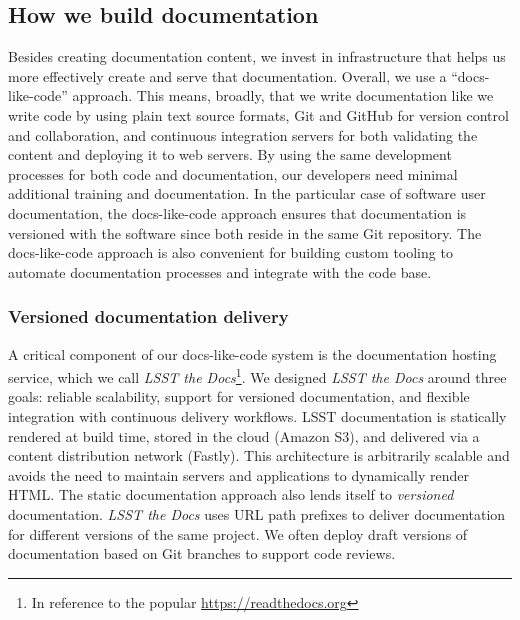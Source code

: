 \subsection{How we build documentation}
\label{sec:doc_builds}

Besides creating documentation content, we invest in infrastructure that helps us more effectively create and serve that documentation.
Overall, we use a ``docs-like-code'' approach.\cite{Gentle:2017}
This means, broadly, that we write documentation like we write code by using plain text source formats, Git and GitHub for version control and collaboration, and continuous integration servers for both validating the content and deploying it to web servers.
By using the same development processes for both code and documentation, our developers need minimal additional training and documentation.
In the particular case of software user documentation, the docs-like-code approach ensures that documentation is versioned with the software since both reside in the same Git repository.
The docs-like-code approach is also convenient for building custom tooling to automate documentation processes and integrate with the code base.

\subsubsection{Versioned documentation delivery}
\label{sec:ltd}

A critical component of our docs-like-code system is the documentation hosting service, which we call \textit{LSST the Docs}\cite{SQR-006}\footnote{In reference to the popular \url{https://readthedocs.org}}.
We designed \textit{LSST the Docs} around three goals: reliable scalability, support for versioned documentation, and flexible integration with continuous delivery workflows.
LSST documentation is statically rendered at build time, stored in the cloud (Amazon S3), and delivered via a content distribution network (Fastly).
This architecture is arbitrarily scalable and avoids the need to maintain servers and applications to dynamically render HTML.
The static documentation approach also lends itself to \emph{versioned} documentation.
\textit{LSST the Docs} uses URL path prefixes to deliver documentation for different versions of the same project.
We often deploy draft versions of documentation based on Git branches to support code reviews.

